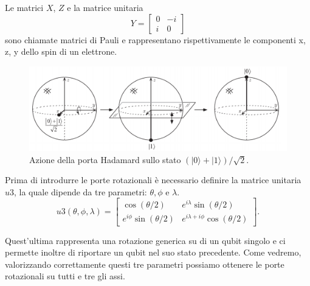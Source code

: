 Le matrici $X$, $Z$ e la matrice unitaria
\begin{equation}
    Y=
    \begin{bmatrix}
        0 & -i\\
        i & 0
    \end{bmatrix}
\end{equation}
sono chiamate matrici di Pauli e rappresentano rispettivamente le componenti x, z, y dello spin di un elettrone.
\begin{figure}[htp]
    \centering
    \includegraphics[width=12cm]{Images/Capitolo2/hadamard_sfera_bloch.png}
    \caption{Azione della porta Hadamard sullo stato $(|0\rangle + |1\rangle)/\sqrt{2}$.}
    \label{fig:hadamard_sfera_bloch}
\end{figure}

Prima di introdurre le porte rotazionali è necessario definire la matrice unitaria $u3$, la quale dipende da tre parametri: $\theta, \phi$ e $\lambda$.
\begin{equation}
    \label{eq:u3}
    u3(\theta,\phi,\lambda) =
    \begin{bmatrix}
       \cos{(\theta/2)} & e^{i\lambda}\sin{(\theta/2)}\\
        e^{i\phi}\sin{(\theta/2)} & e^{i\lambda+i\phi}\cos{(\theta/2)}
    \end{bmatrix}.
\end{equation}

Quest'ultima rappresenta una rotazione generica su di un qubit singolo e ci permette inoltre di riportare un qubit nel suo stato precedente.
Come vedremo, valorizzando correttamente questi tre parametri possiamo ottenere le porte rotazionali su tutti e tre gli assi.

